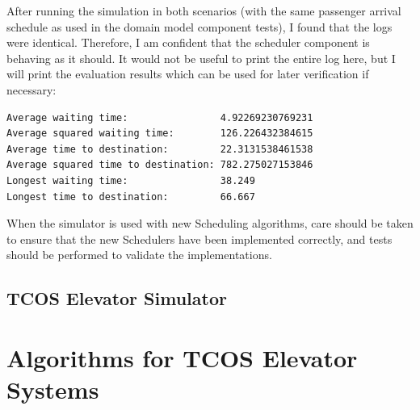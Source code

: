 \documentclass{UoYCSproject}
\begin{document}
After running the simulation in both scenarios (with the same passenger arrival schedule as used in the domain model component tests), I found that the logs were identical.  Therefore, I am confident that the scheduler component is behaving as it should.  It would not be useful to print the entire log here, but I will print the evaluation results which can be used for later verification if necessary:

\begin{lstlisting}
Average waiting time:                4.92269230769231
Average squared waiting time:        126.226432384615
Average time to destination:         22.3131538461538
Average squared time to destination: 782.275027153846
Longest waiting time:                38.249
Longest time to destination:         66.667
\end{lstlisting}

When the simulator is used with new Scheduling algorithms, care should be taken to ensure that the new Schedulers have been implemented correctly, and tests should be performed to validate the implementations.

\chapter{TCOS Elevator Simulator}

\part{Algorithms for TCOS Elevator Systems}


\end{document}
